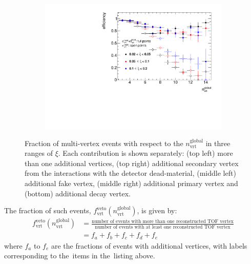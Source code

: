 \begin{figure}[b!]
	\begin{subfigure}{.49\textwidth}
		\includegraphics[width=\textwidth,page=7]{chapters/chrgSTAR/img/vertex/vertexEffi_ksi.pdf}
	\end{subfigure}
	\hfill
	\begin{minipage}{.47\textwidth}
		\caption{Fraction of multi-vertex events  with respect to the $n_\textrm{vrt}^\textrm{global}$ in three ranges of $\xi$. Each contribution is shown separately: (top left) more than one additional vertices, (top right) additional secondary vertex from the interactions with the detector dead-material, (middle left) additional fake vertex, (middle right) additional primary vertex and (bottom) additional decay vertex.}
		\label{fig:vertexVeto}
	\end{minipage}
\end{figure}

The fraction of such events, $f_\textrm{vrt}^\textrm{veto}\left(n_\textrm{vrt}^\textrm{global}\right)$, is given by: 
\begin{equation}
\begin{split}
f_\textrm{vrt}^\textrm{veto}\left(n_\textrm{vrt}^\textrm{global}\right) & =\frac{\textrm{number of events with more than one reconstructed  TOF vertex}}{\textrm{number of events with at least one reconstructed TOF vertex}} \\
& =f_a+f_b+f_c+f_d+f_e
\end{split}
\label{eq:vertexVetoEq}
\end{equation}
where $f_a$ to $f_e$ are the fractions of events with additional vertices, with labels corresponding to the~items in the~listing above.%


